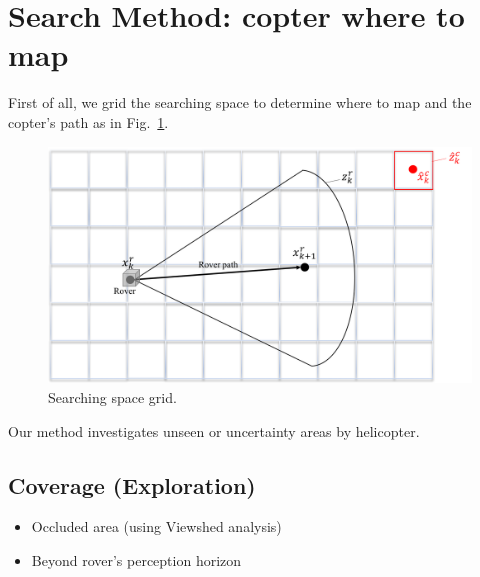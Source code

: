 \documentclass[conference]{IEEEtran}
\begin{document}
\section{Search Method: copter where to map}
First of all, we grid the searching space to determine where to map and the copter's path as in Fig.~\ref{fig:8_3}.\\
\begin{figure}[h]
		\centering
		\includegraphics[width=1.0\columnwidth]{figs/8_3.png}
		\caption{Searching space grid.}
		\label{fig:8_3}
\end{figure}



Our method investigates unseen or uncertainty areas by helicopter.
\subsection*{Coverage (Exploration)}
\begin{itemize}
    \item Occluded area (using Viewshed analysis)
    \item Beyond rover’s perception horizon
\end{itemize}
\end{document}
